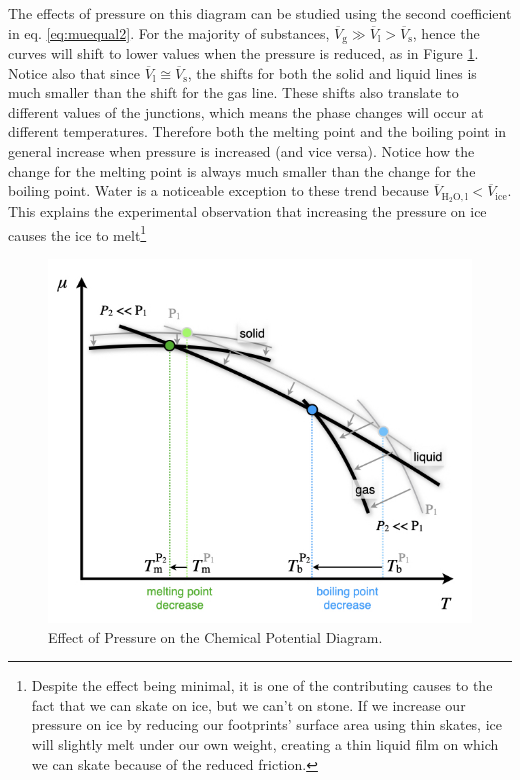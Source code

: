 \documentclass[
  9pt,
]{extbook}
\theoremstyle{definition}
\theoremstyle{definition}
\theoremstyle{definition}
\theoremstyle{definition}
\theoremstyle{remark}
\begin{document}
The effects of pressure on this diagram can be studied using the second coefficient in eq. \eqref{eq:muequal2}. For the majority of substances, \(\overline{V}_{\text{g}} \gg \overline{V}_{\text{l}} > \overline{V}_{\text{s}}\), hence the curves will shift to lower values when the pressure is reduced, as in Figure \ref{fig:FigPhase2}. Notice also that since \(\overline{V}_{\text{l}} \cong \overline{V}_{\text{s}}\), the shifts for both the solid and liquid lines is much smaller than the shift for the gas line. These shifts also translate to different values of the junctions, which means the phase changes will occur at different temperatures. Therefore both the melting point and the boiling point in general increase when pressure is increased (and vice versa). Notice how the change for the melting point is always much smaller than the change for the boiling point.
Water is a noticeable exception to these trend because \(\overline{V}_{\mathrm{H}_2\mathrm{O,l}} < \overline{V}_{\text{ice}}\). This explains the experimental observation that increasing the pressure on ice causes the ice to melt\footnote{Despite the effect being minimal, it is one of the contributing causes to the fact that we can skate on ice, but we can't on stone. If we increase our pressure on ice by reducing our footprints' surface area using thin skates, ice will slightly melt under our own weight, creating a thin liquid film on which we can skate because of the reduced friction.}

\begin{figure}

{\centering \includegraphics[width=0.6\linewidth]{./img/OEP_Figures.017} 

}

\caption{Effect of Pressure on the Chemical Potential Diagram.}\label{fig:FigPhase2}
\end{figure}
\end{document}
